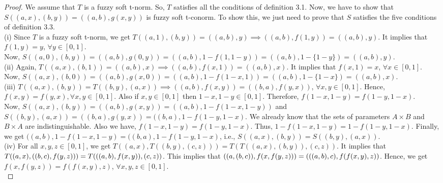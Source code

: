 \documentclass{article}
\theoremstyle{definition}
\begin{document}
\begin{proof}
    We assume that $T$ is a fuzzy soft t-norm. So, $T$ satisfies all the conditions of definition 3.1. Now, we have to show that $S((a, x), (b, y)) = ((a, b), g(x, y))$ is fuzzy soft t-conorm. To show this, we just need to prove that $S$ satisfies the five conditions of definition 3.3.\\

    (i) Since $T$ is a  fuzzy soft t-norm, we get
    $T((a, 1), (b, y))=((a, b), y)\implies ((a, b), f(1, y))=((a, b), y)$. It implies that $f(1, y)=y$, $\forall y\in [0, 1]$.\\

    Now, $S((a, 0), (b, y))=((a, b), g(0, y))=((a, b), 1-f(1, 1-y))=((a, b), 1-\{1-y\})=((a, b), y)$.\\
    
    (ii) Again, $T((a, x), (b, 1))=((a, b), x)\implies ((a, b), f(x, 1))=((a, b), x)$. It implies that $f(x, 1)=x$, $\forall x\in [0, 1]$.\\

    Now, $S((a, x), (b, 0))=((a, b), g(x, 0))=((a, b), 1-f(1-x, 1))=((a, b), 1-\{1-x\})=((a, b), x)$.\\

    (iii)  $T((a, x), (b, y))=T((b, y), (a, x))\implies ((a, b), f(x, y))= ((b, a), f(y, x))$, $\forall x, y \in [0, 1]$. Hence, $f(x, y)=f(y, x), \forall x, y \in [0, 1]$. Also if $x, y \in [0, 1]$ then $1-x, 1-y \in [0, 1]$. Therefore, $f(1-x, 1-y)=f(1-y, 1-x)$.\\

    Now, $S((a, x), (b, y))=((a, b), g(x, y))=((a, b), 1-f(1-x, 1-y))$ and $S((b, y), (a, x))=((b, a), g(y, x))=((b, a), 1-f(1-y, 1-x)$. We already know that the sets of parameters $A\times B$ and $B\times A$ are indistinguishable. Also we have, $f(1-x, 1-y)=f(1-y, 1-x)$. Thus, $1-f(1-x, 1-y)= 1-f(1-y, 1-x)$. Finally, we get $((a, b), 1-f(1-x, 1-y)=((b, a), 1-f(1-y, 1-x)$, i.e., $S((a, x), (b, y))=S((b, y), (a, x))$.\\

    (iv) For all $x, y, z\in [0, 1]$, we get $T((a, x), T((b, y), (c, z)))=T(T((a, x), (b, y)), (c, z))$. It implies that $T((a, x), ((b, c), f(y, z))) = T(((a, b), \\f(x, y)), (c, z))$. This implies that $((a, (b, c)), f(x, f(y, z)))=(((a, b), c), f(f(x, y)\\, z))$. Hence, we get $f(x, f(y, z))=f(f(x, y), z)$, $\forall x, y, z \in [0, 1]$.\\


\end{proof}
\end{document}
